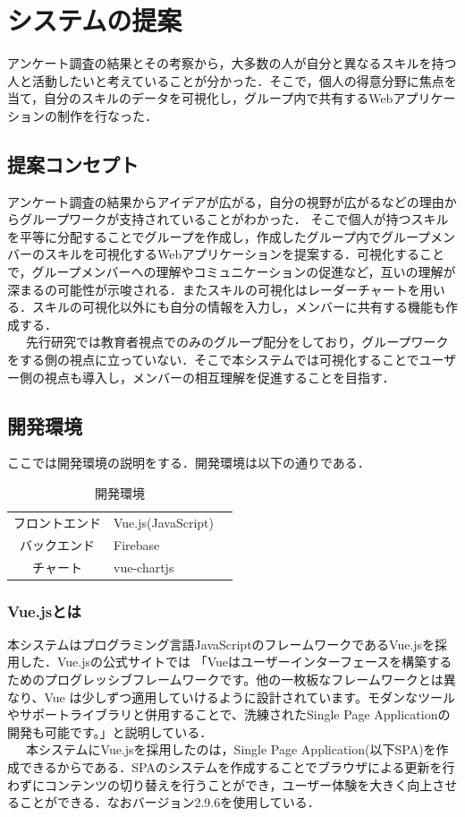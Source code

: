 \documentclass{funthesis}
\begin{document}
\chapter{システムの提案}
アンケート調査の結果とその考察から，大多数の人が自分と異なるスキルを持つ人と活動したいと考えていることが分かった．そこで，個人の得意分野に焦点を当て，自分のスキルのデータを可視化し，グループ内で共有するWebアプリケーションの制作を行なった．

\section{提案コンセプト}
アンケート調査の結果からアイデアが広がる，自分の視野が広がるなどの理由からグループワークが支持されていることがわかった．
そこで個人が持つスキルを平等に分配することでグループを作成し，作成したグループ内でグループメンバーのスキルを可視化するWebアプリケーションを提案する．可視化することで，グループメンバーへの理解やコミュニケーションの促進など，互いの理解が深まるの可能性が示唆される．またスキルの可視化はレーダーチャートを用いる．スキルの可視化以外にも自分の情報を入力し，メンバーに共有する機能も作成する．\\
\ \ \ 先行研究では教育者視点でのみのグループ配分をしており，グループワークをする側の視点に立っていない．そこで本システムでは可視化することでユーザー側の視点も導入し，メンバーの相互理解を促進することを目指す．
\section{開発環境}
ここでは開発環境の説明をする．開発環境は以下の通りである．
\begin{table}[h]
\begin{center}

  \caption{開発環境}
  \begin{tabular}{cll} \hline
    フロントエンド & Vue.js(JavaScript)  \tabularnewline
    バックエンド& Firebase\tabularnewline
    チャート &vue-chartjs \tabularnewline
    \hline
  \end{tabular}
  \label{開発環境}
  \end{center}
\end{table}

\subsection{Vue.jsとは}
本システムはプログラミング言語JavaScriptのフレームワークであるVue.jsを採用した．Vue.jsの公式サイトでは
「Vueはユーザーインターフェースを構築するためのプログレッシブフレームワークです。他の一枚板なフレームワークとは異なり、Vue は少しずつ適用していけるように設計されています。モダンなツールやサポートライブラリと併用することで、洗練されたSingle Page Applicationの開発も可能です。」\cite{A16}と説明している．\\
\ \ \ 本システムにVue.jsを採用したのは，Single Page Application(以下SPA)を作成できるからである．SPAのシステムを作成することでブラウザによる更新を行わずにコンテンツの切り替えを行うことができ，ユーザー体験を大きく向上させることができる．なおバージョン2.9.6を使用している．
\end{document}
